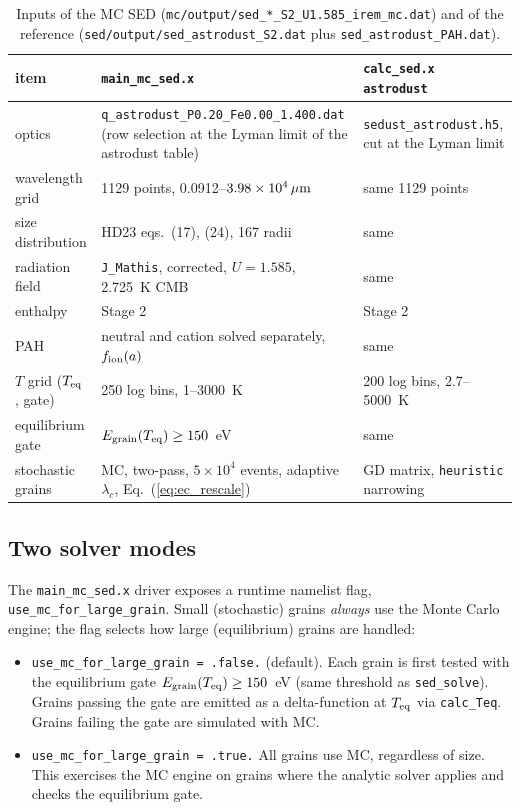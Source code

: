 \documentclass{my_memo}
\newcommand{\Teq}{T_{\rm eq}}
\newcommand{\umc}{\,\mu{\rm m}}
\begin{document}
\begin{table}[ht]
\centering
\caption{Inputs of the MC SED (\texttt{mc/output/sed\_*\_S2\_U1.585\_irem\_mc.dat})
  and of the reference (\texttt{sed/output/sed\_astrodust\_S2.dat} plus
  \texttt{sed\_astrodust\_PAH.dat}).}
\label{tab:inputs}
\begin{tabularx}{\linewidth}{lXX}
\toprule
item & \texttt{main\_mc\_sed.x} & \texttt{calc\_sed.x astrodust} \\
\midrule
optics & \texttt{q\_astrodust\_P0.20\_Fe0.00\_1.400.dat} (row selection at the Lyman limit of the astrodust table) & \texttt{sedust\_astrodust.h5}, cut at the Lyman limit \\
wavelength grid & 1129 points, 0.0912--$3.98\times10^4\umc$ & same 1129 points \\
size distribution & HD23 eqs.~(17), (24), 167 radii & same \\
radiation field & \texttt{J\_Mathis}, corrected, $U=1.585$, 2.725~K CMB & same \\
enthalpy & Stage 2 & Stage 2 \\
PAH & neutral and cation solved separately, $f_{\rm ion}(a)$ & same \\
$T$ grid ($\Teq$, gate) & 250 log bins, 1--3000~K & 200 log bins, 2.7--5000~K \\
equilibrium gate & $E_{\rm grain}(\Teq)\ge150$~eV & same \\
stochastic grains & MC, two-pass, $5\times10^4$ events, adaptive $\lambda_c$, Eq.~(\ref{eq:ec_rescale}) & GD matrix, \texttt{heuristic} narrowing \\
\bottomrule
\end{tabularx}
\end{table}

\subsection{Two solver modes}

The \verb|main_mc_sed.x| driver exposes a runtime namelist flag,
\verb|use_mc_for_large_grain|.  Small (stochastic) grains \emph{always}
use the Monte Carlo engine; the flag selects how large (equilibrium)
grains are handled:
\begin{itemize}
\item \texttt{use\_mc\_for\_large\_grain = .false.} (default).  Each grain
  is first tested with the equilibrium gate
  $E_{\rm grain}(\Teq)\ge 150$~eV (same threshold as
  \texttt{sed\_solve}).  Grains passing the gate are emitted as a
  delta-function at $\Teq$ via \texttt{calc\_Teq}.  Grains failing
  the gate are simulated with MC.
\item \texttt{use\_mc\_for\_large\_grain = .true.}  All grains use MC,
  regardless of size.  This exercises the MC engine on grains where
  the analytic solver applies and checks the equilibrium gate.
\end{itemize}
\end{document}
